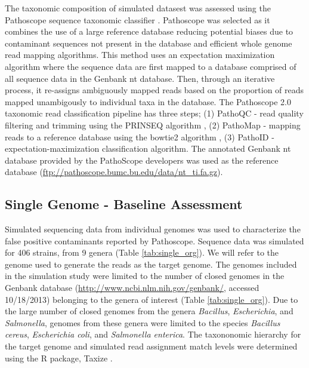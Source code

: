 \documentclass[fleqn,10pt,lineno]{wlpeerj}\usepackage[]{graphicx}\usepackage[]{color}
\begin{document}
The taxonomic composition of simulated datasest was assessed using the Pathoscope sequence taxonomic classifier \citep{Francis2013}.
Pathoscope was selected as it combines the use of a large reference database reducing potential biases due to contaminant sequences not present in the database and efficient whole genome read mapping algorithms.
This method uses an expectation maximization algorithm where the sequence data are first mapped to a database comprised of all sequence data in the Genbank nt database.
Then, through an iterative process, it re-assigns ambiguously mapped reads based on the proportion of reads mapped unambigously to individual taxa in the database.
The Pathoscope 2.0 taxonomic read classification pipeline has three steps; (1) PathoQC - read quality filtering and trimming using the PRINSEQ algorithm \citep{schmieder2011quality}, (2) PathoMap - mapping reads to a reference database using the bowtie2 algorithm \citep{Langmead2012}, (3) PathoID - expectation-maximization classification algorithm.
The annotated Genbank nt database provided by the PathoScope developers was used as the reference database (\url{ftp://pathoscope.bumc.bu.edu/data/nt\_ti.fa.gz}).

\subsection*{Single Genome - Baseline Assessment}
Simulated sequencing data from individual genomes was used to characterize the false positive contaminants reported by Pathoscope. 
Sequence data was simulated for 406 strains, from 9 genera (Table \ref{tab:single_org}).
We will refer to the genome used to generate the reads as the target genome.
The genomes included in the simulation study were limited to the number of closed genomes in the Genbank database (\url{http://www.ncbi.nlm.nih.gov/genbank/}, accessed 10/18/2013) belonging to the genera of interest (Table \ref{tab:single_org}).
Due to the large number of closed genomes from the genera \textit{Bacillus}, \textit{Escherichia}, and \textit{Salmonella}, genomes from these genera were limited to the species \textit{Bacillus cereus}, \textit{Escherichia coli}, and \textit{Salmonella enterica}.
The taxononomic hierarchy for the target genome and simulated read assignment match levels were determined using the R package, Taxize \citep{TaxizeArticle,TaxizeManual}.
\end{document}
